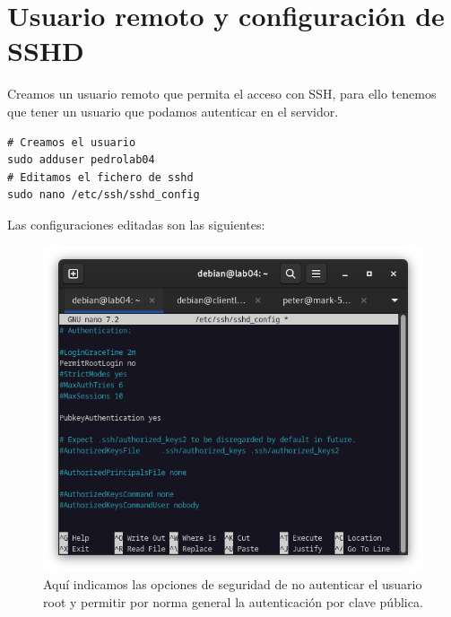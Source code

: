 
\section{Usuario remoto y configuración de SSHD}

Creamos un usuario remoto que permita el acceso con SSH, para ello tenemos que tener un usuario que podamos autenticar  en el servidor.

\begin{lstlisting}[style=mybash]
# Creamos el usuario
sudo adduser pedrolab04
# Editamos el fichero de sshd
sudo nano /etc/ssh/sshd_config
\end{lstlisting}

Las configuraciones editadas son las siguientes:

\begin{figure}[H]
	\centering
	\includegraphics[scale=0.40]{00}
	\caption{Aquí indicamos las opciones de seguridad de no autenticar el usuario root y permitir por norma general la autenticación por clave pública.}
\end{figure}

